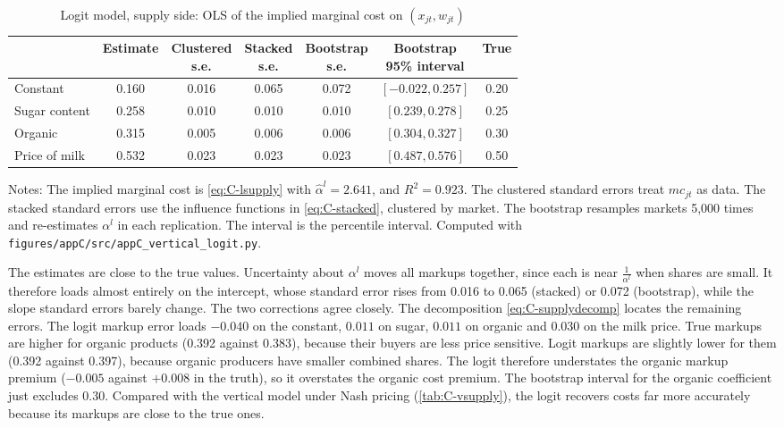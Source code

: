 \begin{table}[htbp]
\centering
\caption{Logit model, supply side: OLS of the implied marginal cost on $(x_{jt}, w_{jt})$}
\label{tab:C-lsupply}
\small
\setlength{\tabcolsep}{5pt}
\begin{tabular}{@{}lcccccc@{}}
\toprule
 & Estimate & \makecell{Clustered\\ s.e.} & \makecell{Stacked\\ s.e.} & \makecell{Bootstrap\\ s.e.}
 & \makecell{Bootstrap\\ 95\% interval} & True \\
\midrule
Constant & 0.160 & 0.016 & 0.065 & 0.072 & $[-0.022, 0.257]$ & 0.20 \\
Sugar content & 0.258 & 0.010 & 0.010 & 0.010 & $[0.239, 0.278]$ & 0.25 \\
Organic & 0.315 & 0.005 & 0.006 & 0.006 & $[0.304, 0.327]$ & 0.30 \\
Price of milk & 0.532 & 0.023 & 0.023 & 0.023 & $[0.487, 0.576]$ & 0.50 \\
\bottomrule
\end{tabular}

\vspace{3pt}
\begin{minipage}{0.97\textwidth}
\footnotesize Notes: The implied marginal cost is \eqref{eq:C-lsupply} with $\hat\alpha^l = 2.641$, and
$R^2 = 0.923$. The clustered standard errors treat $mc_{jt}$ as data. The stacked standard errors use the influence
functions in \eqref{eq:C-stacked}, clustered by market. The bootstrap resamples markets 5,000 times and re-estimates
$\alpha^l$ in each replication. The interval is the percentile interval.
Computed with \texttt{figures/appC/src/appC\_vertical\_logit.py}.
\end{minipage}
\end{table}

The estimates are close to the true values. Uncertainty about $\alpha^l$ moves all markups together, since each is near
$\frac{1}{\alpha^l}$ when shares are small. It therefore loads almost entirely on the intercept, whose standard error rises
from 0.016 to 0.065 (stacked) or 0.072 (bootstrap), while the slope standard errors barely change. The two corrections
agree closely. The decomposition \eqref{eq:C-supplydecomp} locates the remaining errors. The logit markup error loads
$-0.040$ on the constant, $0.011$ on sugar, $0.011$ on organic and $0.030$ on the milk price. True markups are higher for
organic products (0.392 against 0.383), because their buyers are less price sensitive. Logit markups are slightly lower
for them (0.392 against 0.397), because organic producers have smaller combined shares. The logit therefore understates
the organic markup premium ($-0.005$ against $+0.008$ in the truth), so it overstates the organic cost premium. The
bootstrap interval for the organic coefficient just excludes 0.30.
Compared with the vertical model under Nash pricing (\cref{tab:C-vsupply}), the logit recovers costs far more accurately
because its markups are close to the true ones.


